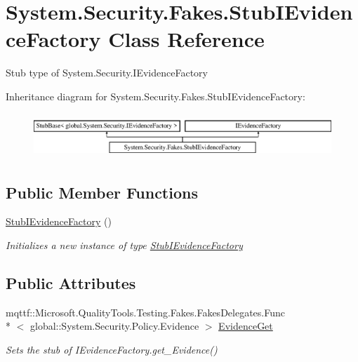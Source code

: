 \hypertarget{class_system_1_1_security_1_1_fakes_1_1_stub_i_evidence_factory}{\section{System.\-Security.\-Fakes.\-Stub\-I\-Evidence\-Factory Class Reference}
\label{class_system_1_1_security_1_1_fakes_1_1_stub_i_evidence_factory}
}


Stub type of System.\-Security.\-I\-Evidence\-Factory 


Inheritance diagram for System.\-Security.\-Fakes.\-Stub\-I\-Evidence\-Factory\-:\begin{figure}[H]
\begin{center}
\leavevmode
\includegraphics[height=1.696970cm]{class_system_1_1_security_1_1_fakes_1_1_stub_i_evidence_factory}
\end{center}
\end{figure}
\subsection*{Public Member Functions}
\begin{DoxyCompactItemize}
\item 
\hyperlink{class_system_1_1_security_1_1_fakes_1_1_stub_i_evidence_factory_a4528a77746651ce0385cd1726e8c9c11}{Stub\-I\-Evidence\-Factory} ()
\begin{DoxyCompactList}\small\item\em Initializes a new instance of type \hyperlink{class_system_1_1_security_1_1_fakes_1_1_stub_i_evidence_factory}{Stub\-I\-Evidence\-Factory}\end{DoxyCompactList}\end{DoxyCompactItemize}
\subsection*{Public Attributes}
\begin{DoxyCompactItemize}
\item 
mqttf\-::\-Microsoft.\-Quality\-Tools.\-Testing.\-Fakes.\-Fakes\-Delegates.\-Func\\*
$<$ global\-::\-System.\-Security.\-Policy.\-Evidence $>$ \hyperlink{class_system_1_1_security_1_1_fakes_1_1_stub_i_evidence_factory_a8e088a588ba6e50ccce2af10a2acac7c}{Evidence\-Get}
\begin{DoxyCompactList}\small\item\em Sets the stub of I\-Evidence\-Factory.\-get\-\_\-\-Evidence()\end{DoxyCompactList}\end{DoxyCompactItemize}


